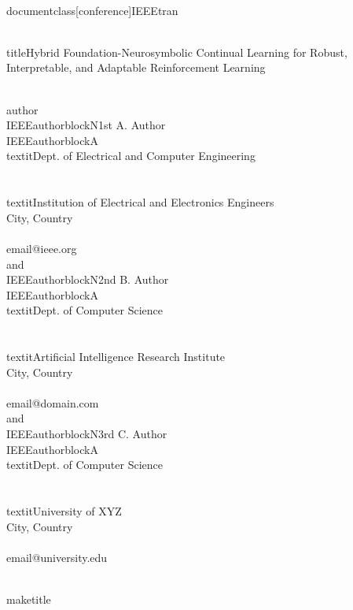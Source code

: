\\documentclass[conference]{IEEEtran}
\begin{document}
\\title{Hybrid Foundation-Neurosymbolic Continual Learning for Robust, Interpretable, and Adaptable Reinforcement Learning}

\\author{\\IEEEauthorblockN{1st A. Author}
\\IEEEauthorblockA{\\textit{Dept. of Electrical and Computer Engineering} \\\\
\\textit{Institution of Electrical and Electronics Engineers}\\
City, Country \\\\
email@ieee.org}
\\and
\\IEEEauthorblockN{2nd B. Author}
\\IEEEauthorblockA{\\textit{Dept. of Computer Science} \\\\
\\textit{Artificial Intelligence Research Institute}\\
City, Country \\\\
email@domain.com}
\\and
\\IEEEauthorblockN{3rd C. Author}
\\IEEEauthorblockA{\\textit{Dept. of Computer Science} \\\\
\\textit{University of XYZ}\\
City, Country \\\\
email@university.edu}
}

\\maketitle
\end{document}
